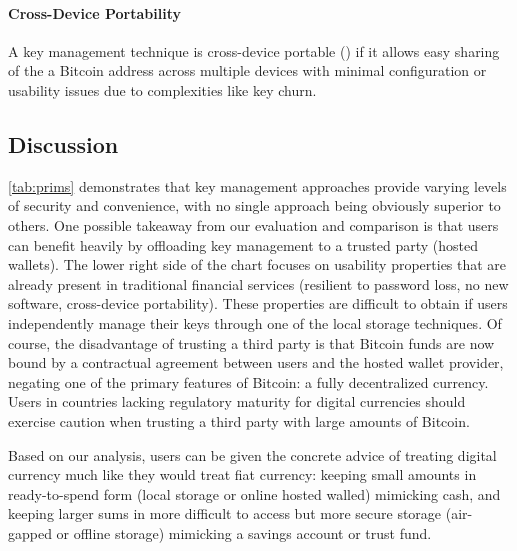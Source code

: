 \paragraph{Cross-Device Portability}
\label{Portable}
A key management technique is cross-device portable (\full) if it allows easy sharing of the a Bitcoin address across multiple devices with minimal configuration or usability issues due to complexities like key churn.

\subsection{Discussion}
\autoref{tab:prims} demonstrates that key management approaches provide varying levels of security and convenience, with no single approach being obviously superior to others. One possible takeaway from our evaluation and comparison is that users can benefit heavily by offloading key management to a trusted party (\eg hosted wallets). The lower right side of the chart focuses on usability properties that are already present in traditional financial services (\ie resilient to password loss, no new software, cross-device portability). These properties are difficult to obtain if users independently manage their keys through one of the local storage techniques. Of course, the disadvantage of trusting a third party is that Bitcoin funds are now bound by a contractual agreement between users and the hosted wallet provider, negating one of the primary features of Bitcoin: a fully decentralized currency. Users in countries lacking regulatory maturity for digital currencies should exercise caution when trusting a third party with large amounts of Bitcoin. 

Based on our analysis, users can be given the concrete advice of treating digital currency much like they would treat fiat currency: keeping small amounts in ready-to-spend form (\eg local storage or online hosted walled) mimicking cash, and keeping larger sums in more difficult to access but more secure storage (\eg air-gapped or offline storage) mimicking a savings account or trust fund. 




